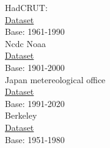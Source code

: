 \documentclass[a4paper,11pt,rmp,superscriptaddress]{revtex4}
\begin{document}
HadCRUT:\\
\href{https://www.metoffice.gov.uk/hadobs/hadcrut5/data/current/download.html} {Dataset}\\
Base: 1961-1990\\

Ncdc Noaa\\
\href{https://www.ncdc.noaa.gov/cag/global/time-series/globe/land_ocean/12/12/1880-2023/data.csv}{Dataset} \\
Base: 1901-2000\\

Japan metereological office\\
\href{https://ds.data.jma.go.jp/tcc/tcc/products/gwp/temp/list/csv/year_wld.csv}{Dataset} \\
Base: 1991-2020\\

Berkeley\\
\href{https://ds.data.jma.go.jp/tcc/tcc/products/gwp/temp/list/csv/year_wld.csv}{Dataset} \\
Base: 1951-1980\\
\end{document}
